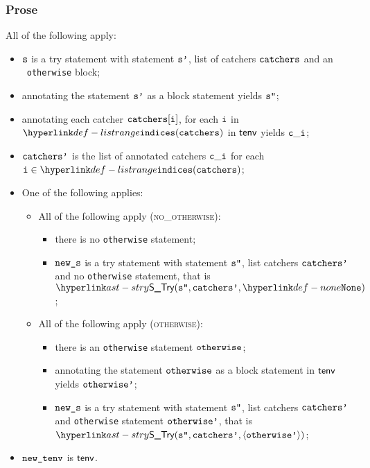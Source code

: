 \subsubsection{Prose}
All of the following apply:
\begin{itemize}
  \item $\texttt{s}$ is a try statement with statement $\texttt{s'}$, list of catchers $\texttt{catchers}$ and an \optional\ \texttt{otherwise} block;
  \item annotating the statement $\texttt{s'}$ as a block statement yields $\texttt{s''}$\ProseOrTypeError;
  \item annotating each catcher $\texttt{catchers}[\texttt{i}]$, for each $\texttt{i}$ in $\listrange(\catchers)$ in $\textsf{tenv}$ yields $\texttt{c}\_\texttt{i}$\ProseOrTypeError;
  \item $\texttt{catchers'}$ is the list of annotated catchers $\texttt{c}\_\texttt{i}$ for each $\vi\in\listrange(\catchers)$;
  \item One of the following applies:
  \begin{itemize}
    \item All of the following apply (\textsc{no\_otherwise}):
    \begin{itemize}
      \item there is no \texttt{otherwise} statement;
      \item $\texttt{new\_s}$ is a try statement with statement $\texttt{s''}$, list catchers $\texttt{catchers'}$ and no \texttt{otherwise} statement,
            that is \\
            $\STry(\vspp, \catchersp, \None)$;
    \end{itemize}

    \item All of the following apply (\textsc{otherwise}):
    \begin{itemize}
      \item there is an \texttt{otherwise} statement $\texttt{otherwise}$;
      \item annotating the statement $\texttt{otherwise}$ as a block statement in $\textsf{tenv}$ yields $\texttt{otherwise'}$\ProseOrTypeError;
      \item $\texttt{new\_s}$ is a try statement with statement $\texttt{s''}$, list catchers $\texttt{catchers'}$ and \texttt{otherwise} statement
            $\texttt{otherwise'}$, that is \\
            $\STry(\vspp, \catchersp, \langle\otherwisep\rangle)$;
    \end{itemize}
  \end{itemize}
  \item $\texttt{new\_tenv}$ is $\textsf{tenv}$.
\end{itemize}
